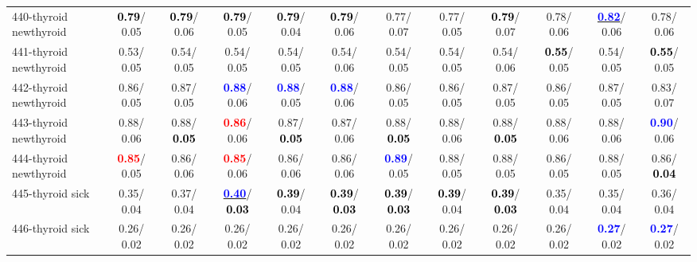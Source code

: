 \begin{table}[h]
\begin{center}
{\begin{tabular}{lc|c|c|c|c|c|c|c|c|c|c}
440-thyroid newthyroid & \textcolor{black}{\textbf{  0.79}}/  0.05 & \textcolor{black}{\textbf{  0.79}}/  0.06 & \textcolor{black}{\textbf{  0.79}}/  0.05 & \textcolor{black}{\textbf{  0.79}}/  0.04 & \textcolor{black}{\textbf{  0.79}}/  0.06 &   0.77/  0.07 &   0.77/  0.05 & \textcolor{black}{\textbf{  0.79}}/  0.07 &   0.78/  0.06 & \underline{\textcolor{blue}{\textbf{  0.82}}}/  0.06 &   0.78/  0.06 \\
441-thyroid newthyroid &   0.53/  0.05 &   0.54/  0.05 &   0.54/  0.05 &   0.54/  0.05 &   0.54/  0.06 &   0.54/  0.05 &   0.54/  0.05 &   0.54/  0.06 & \textcolor{black}{\textbf{  0.55}}/  0.05 &   0.54/  0.05 & \textcolor{black}{\textbf{  0.55}}/  0.05 \\
442-thyroid newthyroid &   0.86/  0.05 &   0.87/  0.05 & \textcolor{blue}{\textbf{  0.88}}/  0.06 & \textcolor{blue}{\textbf{  0.88}}/  0.05 & \textcolor{blue}{\textbf{  0.88}}/  0.06 &   0.86/  0.05 &   0.86/  0.05 &   0.87/  0.05 &   0.86/  0.05 &   0.87/  0.05 &   0.83/  0.07 \\
443-thyroid newthyroid &   0.88/  0.06 &   0.88/\textcolor{black}{\textbf{  0.05}} & \textcolor{red}{\textbf{  0.86}}/  0.06 &   0.87/\textcolor{black}{\textbf{  0.05}} &   0.87/  0.06 &   0.88/\textcolor{black}{\textbf{  0.05}} &   0.88/  0.06 &   0.88/\textcolor{black}{\textbf{  0.05}} &   0.88/  0.06 &   0.88/  0.06 & \textcolor{blue}{\textbf{  0.90}}/  0.06 \\
444-thyroid newthyroid & \textcolor{red}{\textbf{  0.85}}/  0.05 &   0.86/  0.06 & \textcolor{red}{\textbf{  0.85}}/  0.06 &   0.86/  0.06 &   0.86/  0.06 & \textcolor{blue}{\textbf{  0.89}}/  0.05 &   0.88/  0.05 &   0.88/  0.05 &   0.86/  0.05 &   0.88/  0.05 &   0.86/\textcolor{black}{\textbf{  0.04}} \\ \hline
445-thyroid sick &   0.35/  0.04 &   0.37/  0.04 & \underline{\textcolor{blue}{\textbf{  0.40}}}/\textcolor{black}{\textbf{  0.03}} & \textcolor{black}{\textbf{  0.39}}/  0.04 & \textcolor{black}{\textbf{  0.39}}/\textcolor{black}{\textbf{  0.03}} & \textcolor{black}{\textbf{  0.39}}/\textcolor{black}{\textbf{  0.03}} & \textcolor{black}{\textbf{  0.39}}/  0.04 & \textcolor{black}{\textbf{  0.39}}/\textcolor{black}{\textbf{  0.03}} &   0.35/  0.04 &   0.35/  0.04 &   0.36/  0.04 \\
446-thyroid sick &   0.26/  0.02 &   0.26/  0.02 &   0.26/  0.02 &   0.26/  0.02 &   0.26/  0.02 &   0.26/  0.02 &   0.26/  0.02 &   0.26/  0.02 &   0.26/  0.02 & \textcolor{blue}{\textbf{  0.27}}/  0.02 & \textcolor{blue}{\textbf{  0.27}}/  0.02 \\

\end{tabular}}
\end{center}
\end{table}
